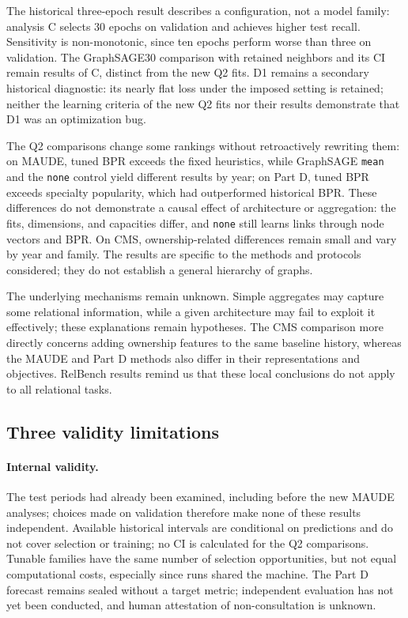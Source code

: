 The historical three-epoch result describes a configuration, not a model family: analysis C selects 30 epochs on validation and achieves higher test recall. Sensitivity is non-monotonic, since ten epochs perform worse than three on validation. The GraphSAGE30 comparison with retained neighbors and its CI remain results of C, distinct from the new Q2 fits. D1 remains a secondary historical diagnostic: its nearly flat loss under the imposed setting is retained; neither the learning criteria of the new Q2 fits nor their results demonstrate that D1 was an optimization bug.

The Q2 comparisons change some rankings without retroactively rewriting them: on MAUDE, tuned BPR exceeds the fixed heuristics, while GraphSAGE \texttt{mean} and the \texttt{none} control yield different results by year; on Part D, tuned BPR exceeds specialty popularity, which had outperformed historical BPR. These differences do not demonstrate a causal effect of architecture or aggregation: the fits, dimensions, and capacities differ, and \texttt{none} still learns links through node vectors and BPR. On CMS, ownership-related differences remain small and vary by year and family. The results are specific to the methods and protocols considered; they do not establish a general hierarchy of graphs.

The underlying mechanisms remain unknown. Simple aggregates may capture some relational information, while a given architecture may fail to exploit it effectively; these explanations remain hypotheses. The CMS comparison more directly concerns adding ownership features to the same baseline history, whereas the MAUDE and Part D methods also differ in their representations and objectives. RelBench results remind us that these local conclusions do not apply to all relational tasks\cite{robinson2024relbench,gu2026relbench}.

\subsection{Three validity limitations}

\paragraph{Internal validity.} The test periods had already been examined, including before the new MAUDE analyses; choices made on validation therefore make none of these results independent. Available historical intervals are conditional on predictions and do not cover selection or training; no CI is calculated for the Q2 comparisons. Tunable families have the same number of selection opportunities, but not equal computational costs, especially since runs shared the machine. The Part D forecast remains sealed without a target metric; independent evaluation has not yet been conducted, and human attestation of non-consultation is unknown.


